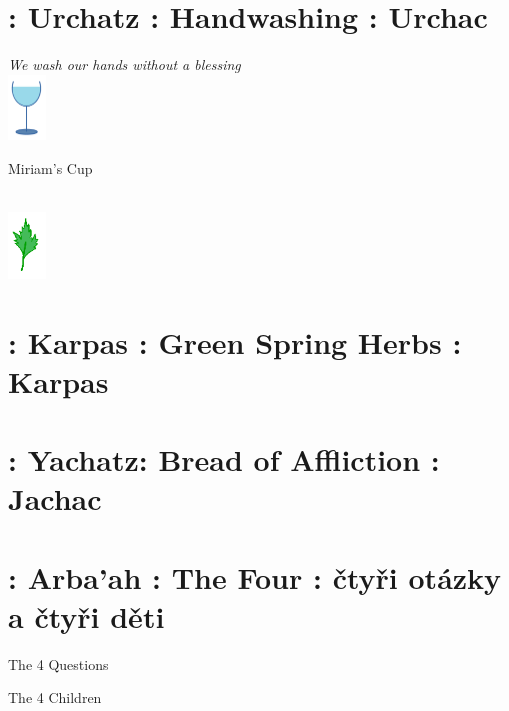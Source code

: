 \documentclass[a5paper,10pt]{memoir}
\begin{document}
\section{ : Urchatz : Handwashing : Urchac}
{{\color{midblue} \textit{We wash our hands without a blessing}}\\
	\urchatz}
\vspace*{2ex}
\hfill\includegraphics[width=10mm]{Miriam}
\vspace*{-12ex}  %
\begin{center}
	\noindent \large \color{midblue} Miriam's Cup
\end{center}
\Miriam \\
% 
\vspace*{-3ex}
\hfill\includegraphics[width=10mm]{Karpas}
\vspace*{-12ex}  %
\section{ : Karpas : Green Spring Herbs : Karpas}
 \Karpas
\vspace*{1ex}
\section{ : Yachatz: Bread of Affliction : Jachac}
\Yachatz
\vspace*{2ex}
\section{ : Arba'ah : The Four : čtyři otázky a čtyři děti}
\begin{center}
	\noindent \large \color{midblue} The 4 Questions
\end{center}
\MaNishtana
\begin{center}
	\noindent \large \color{midblue} The 4 Children
\end{center}
\ArbaAh
%
\vspace*{2ex}
\end{document}
